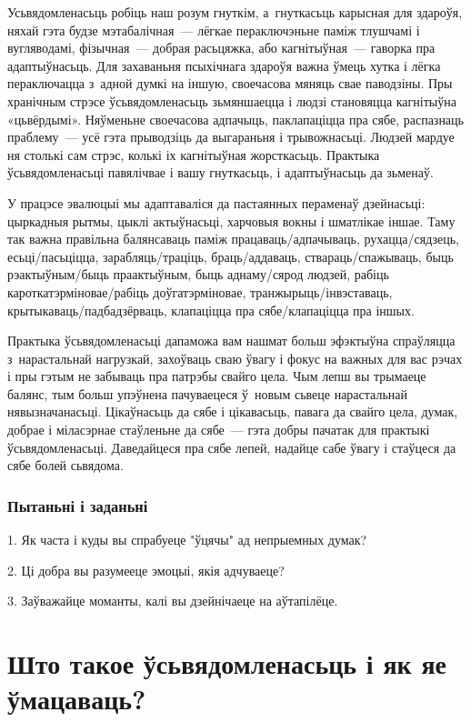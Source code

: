 Усьвядомленасьць робіць наш розум гнуткім, а~гнуткасьць карысная для здароўя, няхай гэта будзе мэтабалічная~--- лёгкае пераключэньне паміж тлушчамі і вугляводамі, фізычная~--- добрая расьцяжка, або кагнітыўная~--- гаворка пра адаптыўнасьць. Для захаваньня псыхічнага здароўя важна ўмець хутка і лёгка пераключацца з~адной думкі на іншую, своечасова мяняць свае паводзіны. Пры хранічным стрэсе ўсьвядомленасьць зьмяншаецца і людзі становяцца кагнітыўна «цьвёрдымі». Няўменьне своечасова адпачыць, паклапаціцца пра сябе, распазнаць праблему~--- усё гэта прыводзіць да выгараньня і трывожнасьці. Людзей мардуе ня столькі сам стрэс, колькі іх кагнітыўная жорсткасьць. Практыка ўсьвядомленасьці павялічвае і вашу гнуткасьць, і адаптыўнасьць да зьменаў.

У працэсе эвалюцыі мы адаптаваліся да пастаянных пераменаў дзейнасьці: цыркадныя рытмы, цыклі актыўнасьці, харчовыя вокны і шматлікае іншае. Таму так важна правільна балянсаваць паміж працаваць/адпачываць, рухацца/сядзець, есьці/пасьціцца, зарабляць/траціць, браць/аддаваць, ствараць/спажываць, быць рэактыўным/быць праактыўным, быць аднаму/сярод людзей, рабіць кароткатэрміновае/рабіць доўгатэрміновае, транжырыць/інвэставаць, крытыкаваць/падбадзёрваць, клапаціцца пра сябе/клапаціцца пра іншых.

Практыка ўсьвядомленасьці дапаможа вам нашмат больш эфэктыўна спраўляцца з~нарастальнай нагрузкай, захоўваць сваю ўвагу і фокус на важных для вас рэчах і пры гэтым не забываць пра патрэбы свайго цела. Чым лепш вы трымаеце балянс, тым больш упэўнена пачуваецеся ў~новым сьвеце нарастальнай нявызначанасьці. Цікаўнасьць да сябе і цікавасьць, павага да свайго цела, думак, добрае і міласэрнае стаўленьне да сябе~--- гэта добры пачатак для практыкі ўсьвядомленасьці. Даведайцеся пра сябе лепей, надайце сабе ўвагу і стаўцеся да сябе болей сьвядома.

\subsubsection{Пытаньні і заданьні}

1. Як часта і куды вы спрабуеце "ўцячы" ад непрыемных думак?

2. Ці добра вы разумееце эмоцыі, якія адчуваеце?

3. Заўважайце моманты, калі вы дзейнічаеце на аўтапілёце.


\section{Што такое ўсьвядомленасьць і як яе ўмацаваць?}

